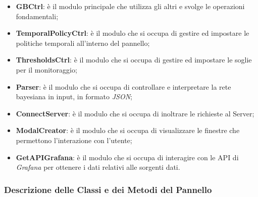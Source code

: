 \begin{itemize}
	\item \textbf{GBCtrl}: è il modulo principale che utilizza gli altri e svolge le operazioni fondamentali;
	\item \textbf{TemporalPolicyCtrl}: è il modulo che si occupa di gestire ed impostare le politiche temporali all'interno del pannello;
	\item \textbf{ThresholdsCtrl}: è il modulo che si occupa di gestire ed impostare le soglie per il monitoraggio;
	\item \textbf{Parser}: è il modulo che si occupa di controllare e interpretare la rete bayesiana in input, in formato \textit{JSON};
	\item \textbf{ConnectServer}: è il modulo che si occupa di inoltrare le richieste al Server;
	\item \textbf{ModalCreator}: è il modulo che si occupa di visualizzare le finestre che permettono l'interazione con l'utente;
	\item \textbf{GetAPIGrafana}: è il modulo che si occupa di interagire con le API di \textit{Grafana} per ottenere i dati relativi alle sorgenti dati.
\end{itemize}




\subsubsection{Descrizione delle Classi e dei Metodi del Pannello}\label{classiPannelloDescrizione}
	

